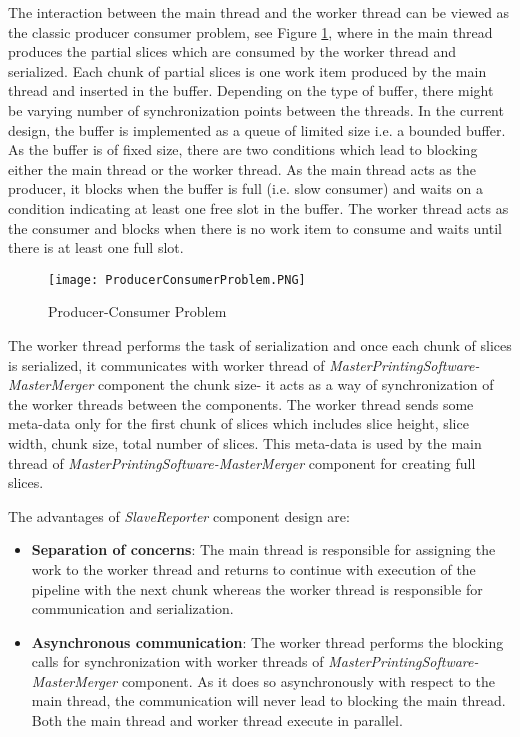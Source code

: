 The interaction between the main thread and the worker thread can be viewed as the classic producer consumer problem, see Figure \ref{fig:ProducerConsumerProblem}, where in the main thread produces the partial slices which are consumed by the worker thread and serialized. Each chunk of partial slices is one work item produced by the main thread and inserted in the buffer. Depending on the type of buffer, there might be varying number of synchronization points between the threads. In the current design, the buffer is implemented as a queue of limited size i.e. a bounded buffer. As the buffer is of fixed size, there are two conditions which lead to blocking either the main thread or the worker thread. As the main thread acts as the producer, it blocks when the buffer is full (i.e. slow consumer) and waits on a condition indicating at least one free slot in the buffer. The worker thread acts as the consumer and blocks when there is no work item to consume and waits until there is at least one full slot. \newline

\begin{figure}[t]
\centering
\texttt{[image: ProducerConsumerProblem.PNG]}
\caption{Producer-Consumer Problem}
\label{fig:ProducerConsumerProblem}
\end{figure}

The worker thread performs the task of serialization and once each chunk of slices is serialized, it communicates with worker thread of \textit{MasterPrintingSoftware-MasterMerger} component the chunk size- it acts as a way of synchronization of the worker threads between the components. The worker thread sends some meta-data  only for the first chunk of slices which includes slice height, slice width, chunk size, total number of slices. This meta-data is used by the main thread of \textit{MasterPrintingSoftware-MasterMerger} component for creating full slices.\newline

The advantages of \textit{SlaveReporter} component design are:
\begin{itemize}
\item \textbf{Separation of concerns}: The main thread is responsible for assigning the work to the worker thread and returns to continue with execution of the pipeline with the next chunk whereas the worker thread is responsible for communication and serialization.  
\item \textbf{Asynchronous communication}: The worker thread performs the blocking calls for synchronization with worker threads of \textit{MasterPrintingSoftware-MasterMerger} component. As it does so asynchronously with respect to the main thread, the communication will never lead to blocking the main thread. Both the main thread and worker thread execute in parallel.
\end{itemize} 

